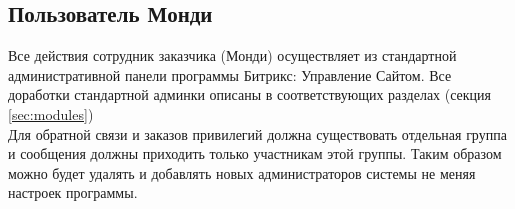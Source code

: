 \documentclass[DIV=calc, paper=a4, fontsize=11pt]{scrartcl} %
\newcommand{\clientName}{Монди}
\begin{document}
\subsection{Пользователь \clientName}

Все действия сотрудник заказчика (\clientName) осуществляет из стандартной административной панели программы Битрикс: Управление Сайтом. Все доработки стандартной админки описаны в соответствующих разделах (секция \ref{sec:modules})
\\[0.5cm]
Для обратной связи и заказов привилегий должна существовать отдельная группа и сообщения должны приходить только участникам этой группы. Таким образом можно будет удалять и добавлять новых администраторов системы не меняя настроек программы.
\end{document}
